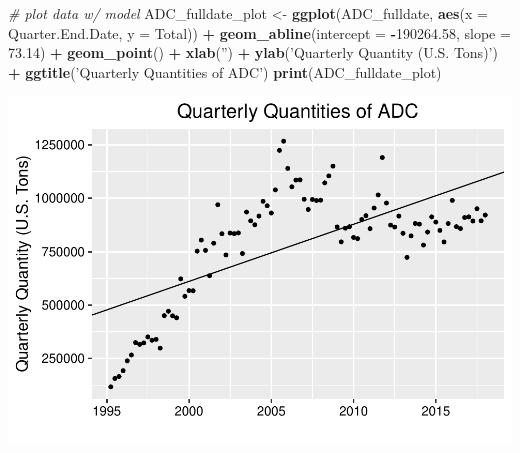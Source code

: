 \documentclass[12pt,]{article}
\newenvironment{Shaded}{\begin{snugshade}}{\end{snugshade}}
\newcommand{\KeywordTok}[1]{\textcolor[rgb]{0.13,0.29,0.53}{\textbf{#1}}}
\newcommand{\DataTypeTok}[1]{\textcolor[rgb]{0.13,0.29,0.53}{#1}}
\newcommand{\FloatTok}[1]{\textcolor[rgb]{0.00,0.00,0.81}{#1}}
\newcommand{\StringTok}[1]{\textcolor[rgb]{0.31,0.60,0.02}{#1}}
\newcommand{\CommentTok}[1]{\textcolor[rgb]{0.56,0.35,0.01}{\textit{#1}}}
\newcommand{\OperatorTok}[1]{\textcolor[rgb]{0.81,0.36,0.00}{\textbf{#1}}}
\newcommand{\NormalTok}[1]{#1}
\begin{document}
\begin{Shaded}
\begin{Highlighting}[]
\CommentTok{# plot data w/ model}
\NormalTok{ADC_fulldate_plot <-}\StringTok{ }\KeywordTok{ggplot}\NormalTok{(ADC_fulldate, }\KeywordTok{aes}\NormalTok{(}\DataTypeTok{x =}\NormalTok{ Quarter.End.Date, }\DataTypeTok{y =}\NormalTok{ Total)) }\OperatorTok{+}
\StringTok{  }\KeywordTok{geom_abline}\NormalTok{(}\DataTypeTok{intercept =} \OperatorTok{-}\FloatTok{190264.58}\NormalTok{, }\DataTypeTok{slope =} \FloatTok{73.14}\NormalTok{) }\OperatorTok{+}\StringTok{ }
\StringTok{  }\KeywordTok{geom_point}\NormalTok{() }\OperatorTok{+}\StringTok{ }
\StringTok{  }\KeywordTok{xlab}\NormalTok{(}\StringTok{''}\NormalTok{) }\OperatorTok{+}\StringTok{ }
\StringTok{  }\KeywordTok{ylab}\NormalTok{(}\StringTok{'Quarterly Quantity (U.S. Tons)'}\NormalTok{) }\OperatorTok{+}\StringTok{ }
\StringTok{  }\KeywordTok{ggtitle}\NormalTok{(}\StringTok{'Quarterly Quantities of ADC'}\NormalTok{) }
\KeywordTok{print}\NormalTok{(ADC_fulldate_plot)}
\end{Highlighting}
\end{Shaded}

\includegraphics{SKo_Project_Template_files/figure-latex/Test2-3.pdf}
\end{document}
